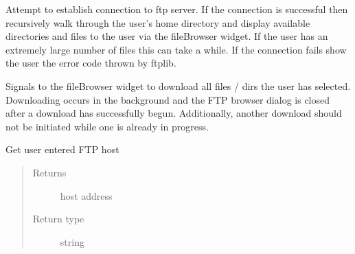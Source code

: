 \documentclass[letterpaper,10pt,english]{sphinxmanual}
\begin{document}
\begin{fulllineitems}
\begin{fulllineitems}
\label{\detokenize{polo.windows:polo.windows.ftp_dialog.FTPDialog.connect_ftp}}
Attempt to establish connection to ftp server. If the connection is
successful then recursively walk through the user’s home directory
and display available directories and files to the user via the
fileBrowser widget. If the user has an extremely large number of
files this can take a while. If the connection fails show the user
the error code thrown by ftplib.

\end{fulllineitems}


\begin{fulllineitems}
\label{\detokenize{polo.windows:polo.windows.ftp_dialog.FTPDialog.download_selected_files}}
Signals to the fileBrowser widget to download all files / dirs the
user has selected. Downloading occurs in the background and the FTP
browser dialog is closed after a download has successfully begun.
Additionally, another download should not be initiated while one is
already in progress.

\end{fulllineitems}


\begin{fulllineitems}
\label{\detokenize{polo.windows:polo.windows.ftp_dialog.FTPDialog.host}}
Get user entered FTP host
\begin{quote}\begin{description}
\item[{Returns}] \leavevmode
host address

\item[{Return type}] \leavevmode
string

\end{description}\end{quote}

\end{fulllineitems}


\end{fulllineitems}
\end{document}
